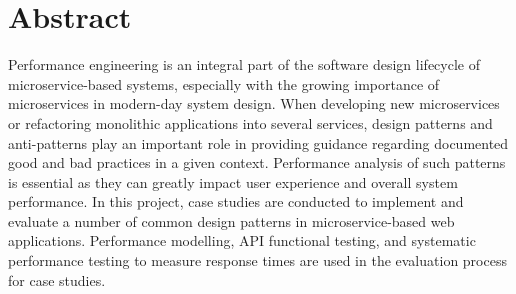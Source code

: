 \chapter*{Abstract}

Performance engineering is an integral part of the software design lifecycle of microservice-based systems, especially with the growing importance of microservices in modern-day system design. When developing new microservices or refactoring monolithic applications into several services, design patterns and anti-patterns play an important role in providing guidance regarding documented good and bad practices in a given context. Performance analysis of such patterns is essential as they can greatly impact user experience and overall system performance. In this project, case studies are conducted to implement and evaluate a number of common design patterns in microservice-based web applications. Performance modelling, API functional testing, and systematic performance testing to measure response times are used in the evaluation process for case studies.